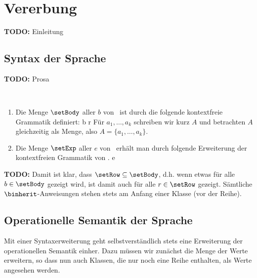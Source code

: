 

\chapter{Vererbung}
\label{kapitel:Vererbung}


{\bf TODO:} Einleitung


\section{Syntax der Sprache \Lc}

{\bf TODO:} Prosa

\begin{definition} \
  \begin{enumerate}
    \item Die Menge $\setBody$ aller  $b$ von \Lc\ ist durch
          die folgende kontextfreie Grammatik definiert:
          \GRbeg
          b \GRis {}
            \GRal r
          \GRend
          F\"ur $a_1,\ldots,a_k$ schreiben wir kurz $A$ und betrachten $A$ gleichzeitig als
          Menge, also $A = \{a_1,\ldots,a_k\}$.

    \item Die Menge $\setExp$ aller  $e$ von \Lc\ erh\"alt man durch
          folgende Erweiterung der kontextfreien Grammatik von \Lo.
          \GRbeg
          e \GRis {}
            \GRal {}
          \GRend
  \end{enumerate}
\end{definition}

{\bf TODO:} Damit ist klar, dass $\setRow \subseteq \setBody$, d.h. wenn etwas f\"ur alle $b\in\setBody$
gezeigt wird, ist damit auch f\"ur alle $r\in\setRow$ gezeigt. S\"amtliche $\binherit$-Anweisungen stehen
stets am Anfang einer Klasse (vor der Reihe).



\section{Operationelle Semantik der Sprache \Lc}

Mit einer Syntaxerweiterung geht selbstverst\"andlich stets eine Erweiterung der operationellen Semantik
einher. Dazu m\"ussen wir zun\"achst die Menge der Werte erweitern, so dass nun auch Klassen, die nur
noch eine Reihe enthalten, als Werte angesehen werden.

